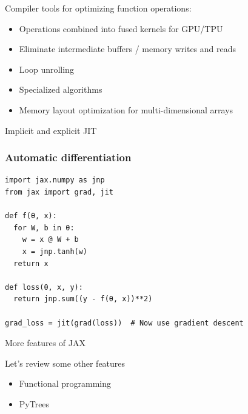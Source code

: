 \begin{frame}
    
    Compiler tools for optimizing function operations:

    \begin{itemize}
        \item Operations combined into fused kernels for GPU/TPU
        \vspace{0.5em}
        \item Eliminate intermediate buffers / memory writes and reads
        \vspace{0.5em}
        \item Loop unrolling
        \vspace{0.5em}
        \item Specialized algorithms
        \vspace{0.5em}
        \item Memory layout optimization for multi-dimensional arrays
    \end{itemize}

\end{frame}

\begin{frame}

    Implicit and explicit JIT 

    \begin{figure}[h!]
        \centering
        \scalebox{0.45}{}
    \end{figure}
    
\end{frame}




\begin{frame}[fragile]
    \frametitle{Automatic differentiation}
    
    \vspace{-1em}
    \begin{verbatim}
import jax.numpy as jnp
from jax import grad, jit

def f(θ, x):
  for W, b in θ:
    w = x @ W + b
    x = jnp.tanh(w)  
  return x

def loss(θ, x, y):
  return jnp.sum((y - f(θ, x))**2)

grad_loss = jit(grad(loss))  # Now use gradient descent 
    \end{verbatim}

\end{frame}



\begin{frame}{More features of JAX}

    Let's review some other features

        \vspace{0.5em}

    \begin{itemize}
        \item Functional programming
        \vspace{0.5em}
        \item PyTrees
    \end{itemize}
    
\end{frame}

